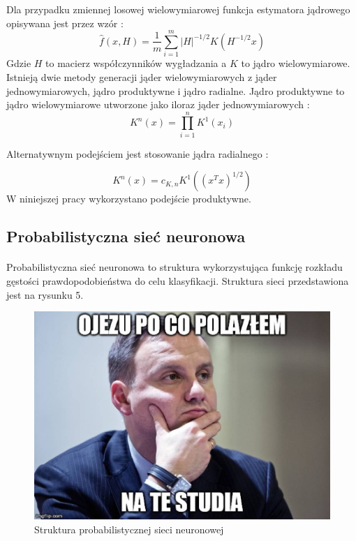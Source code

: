 \documentclass[a4paper,12pt,twoside]{article}
\begin{document}
\newpage
Dla przypadku zmiennej losowej wielowymiarowej funkcja estymatora jądrowego opisywana jest przez wzór \cite{kde2}: \begin{equation}
\hat{f}(x,H)=\frac{1}{m}\sum_{i=1}^{m}\left | H \right |^{-1/2} K\left ( H^{-1/2}x \right )\label{eq:1}
\end{equation}
Gdzie $H$ to macierz współczynników wygładzania a $K$ to jądro wielowymiarowe.
Istnieją dwie metody generacji jąder wielowymiarowych z jąder jednowymiarowych, jądro produktywne i jądro radialne. Jądro produktywne to jądro wielowymiarowe utworzone jako iloraz jąder jednowymiarowych \cite{kde2}:
\begin{equation} K^n(x)=\prod_{i=1}^{n} K^1(x_{i})
\end{equation}

Alternatywnym podejściem jest stosowanie jądra radialnego \cite{kde2}:

\begin{equation} K^n(x)=c_{K,n}K^1((x^Tx)^{1/2})
\end{equation}
W niniejszej pracy wykorzystano podejście produktywne.
\subsection{Probabilistyczna sieć neuronowa}
\paragraph{}
Probabilistyczna sieć neuronowa to struktura wykorzystująca funkcję rozkładu gęstości prawdopodobieństwa  do celu klasyfikacji. Struktura sieci przedstawiona jest na rysunku 5. 
\begin{figure}[h]
    \centering
    \includegraphics[width=1\textwidth]{dudel.jpg}
    \caption{Struktura probabilistycznej sieci neuronowej}
\end{figure}
\end{document}
